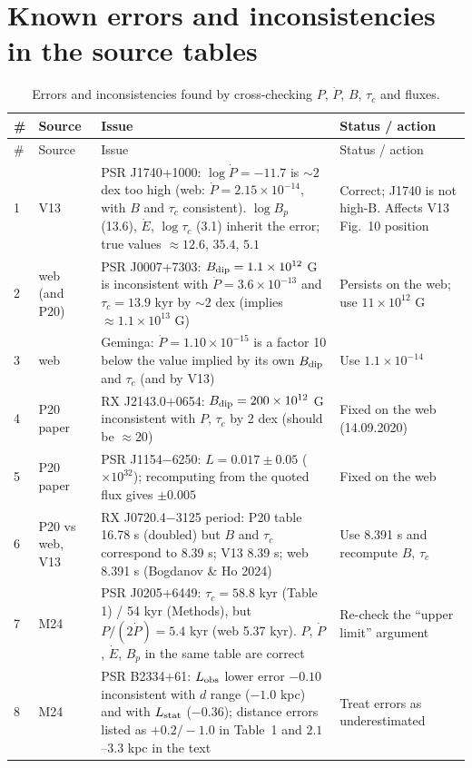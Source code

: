 \documentclass[11pt,a4paper]{article}
\begin{document}
\section{Known errors and inconsistencies in the source tables}
\begin{longtable}{P{0.9cm}P{2.0cm}P{6.2cm}P{4.4cm}}
\caption{Errors and inconsistencies found by cross-checking $P$, $\dot P$, $B$, $\tau_c$ and fluxes.}\label{tab:errors}\\
\toprule
\# & Source & Issue & Status / action \\
\midrule
\endfirsthead
\toprule \# & Source & Issue & Status / action \\ \midrule
{} & V13 & PSR J1740+1000: $\log\dot P=-11.7$ is $\sim2$ dex too high (web: $\dot P=2.15\times10^{-14}$, with $B$ and $\tau_c$ consistent). $\log B_p$ (13.6), $\dot E$, $\log\tau_c$ (3.1) inherit the error; true values $\approx12.6$, $35.4$, $5.1$ & Correct; J1740 is not high-B. Affects V13 Fig.~10 position \\
2 & web (and P20) & PSR J0007+7303: $B_{\rm dip}=1.1\times10^{12}$ G is inconsistent with $\dot P=3.6\times10^{-13}$ and $\tau_c=13.9$ kyr by $\sim2$ dex (implies $\approx1.1\times10^{13}$ G) & Persists on the web; use $11\times10^{12}$ G \\
3 & web & Geminga: $\dot P=1.10\times10^{-15}$ is a factor 10 below the value implied by its own $B_{\rm dip}$ and $\tau_c$ (and by V13) & Use $1.1\times10^{-14}$ \\
4 & P20 paper & RX J2143.0+0654: $B_{\rm dip}=200\times10^{12}$ G inconsistent with $P$, $\tau_c$ by 2 dex (should be $\approx20$) & Fixed on the web (14.09.2020) \\
5 & P20 paper & PSR J1154$-$6250: $L=0.017\pm0.05$ ($\times10^{32}$); recomputing from the quoted flux gives $\pm0.005$ & Fixed on the web \\
6 & P20 vs web, V13 & RX J0720.4$-$3125 period: P20 table 16.78 s (doubled) but $B$ and $\tau_c$ correspond to 8.39 s; V13 8.39 s; web 8.391 s (Bogdanov \& Ho 2024) & Use 8.391 s and recompute $B$, $\tau_c$ \\
7 & M24 & PSR J0205+6449: $\tau_c=58.8$ kyr (Table 1) / 54 kyr (Methods), but $P/(2\dot P)=5.4$ kyr (web 5.37 kyr). $P$, $\dot P$, $\dot E$, $B_p$ in the same table are correct & Re-check the ``upper limit'' argument \\
8 & M24 & PSR B2334+61: $L_{\rm obs}$ lower error $-0.10$ inconsistent with $d$ range ($-1.0$ kpc) and with $L_{\rm stat}$ ($-0.36$); distance errors listed as $+0.2/-1.0$ in Table~1 and $2.1$--$3.3$ kpc in the text & Treat errors as underestimated \\

\end{longtable}
\end{document}
